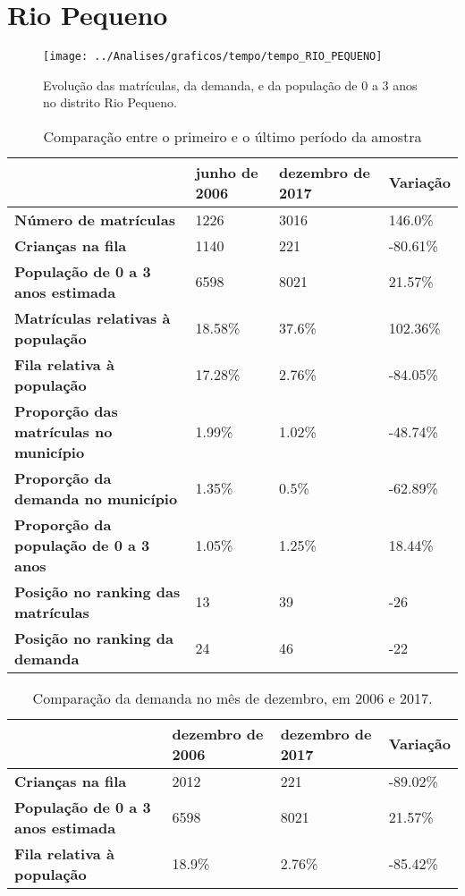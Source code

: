 \section{Rio Pequeno}
\begin{figure}[H]
\centering
\texttt{[image: ../Analises/graficos/tempo/tempo\_RIO\_PEQUENO]}
\caption{Evolução das matrículas, da demanda, e da população de 0 a 3 anos no distrito Rio Pequeno.}
\end{figure}
\begin{table}[H]
\begin{tabular}{|l|l|l|l|}
\hline
\textbf{}                                      & \textbf{junho de 2006}       & \textbf{dezembro de 2017}    & \textbf{Variação} \\ \hline
\textbf{Número de matrículas}                  & 1226 & 3016 & 146.0\% \\ \hline
\textbf{Crianças na fila}                      & 1140 & 221 & -80.61\% \\ \hline
\textbf{População de 0 a 3 anos estimada}      & 6598 & 8021 & 21.57\% \\ \hline
\textbf{Matrículas relativas à população}      & 18.58\% & 37.6\% & 102.36\% \\ \hline
\textbf{Fila relativa à população}             & 17.28\% & 2.76\% & -84.05\% \\ \hline
\textbf{Proporção das matrículas no município} & 1.99\% & 1.02\% & -48.74\% \\ \hline
\textbf{Proporção da demanda no município}     & 1.35\% & 0.5\% & -62.89\% \\ \hline
\textbf{Proporção da população de 0 a 3 anos}  & 1.05\% & 1.25\% & 18.44\% \\ \hline
\textbf{Posição no ranking das matrículas}     & 13 & 39 & -26 \\ \hline
\textbf{Posição no ranking da demanda}         & 24 & 46 & -22 \\ \hline
\end{tabular}
\caption{Comparação entre o primeiro e o último período da amostra}
\end{table}
\begin{table}[H]
\begin{tabular}{|l|l|l|l|}
\hline
\textbf{}                                 & \textbf{dezembro de 2006} & \textbf{dezembro de 2017} & \textbf{Variação} \\ \hline
\textbf{Crianças na fila}                      & 2012 & 221 & -89.02\% \\ \hline
\textbf{População de 0 a 3 anos estimada}      & 6598 & 8021 & 21.57\% \\ \hline
\textbf{Fila relativa à população}             & 18.9\% & 2.76\% & -85.42\% \\ \hline
\end{tabular}
\caption{Comparação da demanda no mês de dezembro, em 2006 e 2017.}
\end{table}
